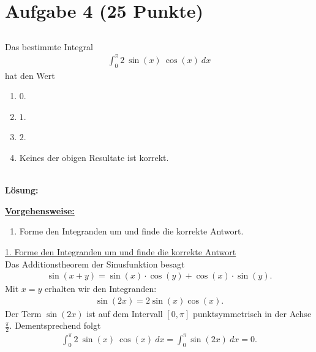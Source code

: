 \section*{Aufgabe 4 (25 Punkte)}
\vspace{0.4cm}
\subsection*{}
Das bestimmte Integral
\begin{align*}
\int_0^\pi 2 \ \sin(x) \ \cos(x) \ dx
\end{align*}
hat den Wert
\renewcommand{\labelenumi}{(\alph{enumi})}
\begin{enumerate}
	\item 
	$0$.
	\item
	$1$.
	\item
	$2$.
	\item
	Keines der obigen Resultate ist korrekt.
\end{enumerate}
\ \\
\textbf{Lösung:}
\begin{mdframed}
\underline{\textbf{Vorgehensweise:}}
\renewcommand{\labelenumi}{\theenumi.}
\begin{enumerate}
\item Forme den Integranden um und finde die korrekte Antwort.
\end{enumerate}
\end{mdframed}

\underline{1. Forme den Integranden um und finde die korrekte Antwort}\\
Das Additionstheorem der Sinusfunktion besagt
\begin{align*}
\sin(x + y)
= \sin(x) \cdot \cos(y) + \cos(x) \cdot \sin(y).
\end{align*}
Mit $ x = y  $ erhalten wir den Integranden:
\begin{align*}
\sin(2x) = 2 \sin(x) \cos(x).
\end{align*}
Der Term $ \sin(2x) $ ist auf dem Intervall $ [0,\pi] $ punktsymmetrisch in der Achse $ \frac{\pi}{2} $.
Dementsprechend folgt
\begin{align*}
\int_0^\pi 2 \ \sin(x) \ \cos(x) \ dx
=
\int_0^\pi \sin(2x) \ dx = 0.
\end{align*}
\begin{center}
\end{center}

